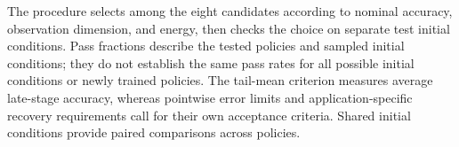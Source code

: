 The procedure selects among the eight candidates according to nominal accuracy, observation dimension, and energy, then checks the choice on separate test initial conditions. Pass fractions describe the tested policies and sampled initial conditions; they do not establish the same pass rates for all possible initial conditions or newly trained policies. The tail-mean criterion measures average late-stage accuracy, whereas pointwise error limits and application-specific recovery requirements call for their own acceptance criteria. Shared initial conditions provide paired comparisons across policies.


